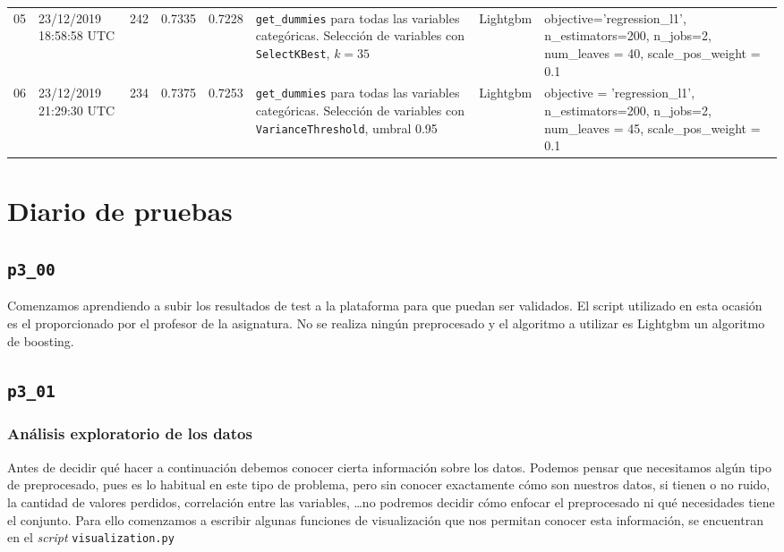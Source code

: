 \documentclass[a4paper, 20pt]{article}
\begin{document}
\begin{table}[H]
{\begin{tabular}{lL{2cm}lllL{3cm}L{2.5cm}L{3.5cm}}
05 & 23/12/2019 18:58:58 UTC & 242 & 0.7335 & 0.7228 & \texttt{get\_dummies} para todas las variables categóricas. Selección de variables con \texttt{SelectKBest}, $k =35$ & Lightgbm & {\ttfamily objective='regression\_l1', n\_estimators=200, n\_jobs=2, num\_leaves = 40, scale\_pos\_weight = 0.1}\\

06 & 23/12/2019 21:29:30 UTC & 234 & 0.7375 & 0.7253 & \texttt{get\_dummies} para todas las variables categóricas. Selección de variables con \texttt{VarianceThreshold}, umbral 0.95 & Lightgbm & {\ttfamily objective = 'regression\_l1', n\_estimators=200, n\_jobs=2, num\_leaves = 45, scale\_pos\_weight = 0.1}\\
\bottomrule
\end{tabular}}
\end{table}
\newpage

\section{Diario de pruebas}
\subsection{\texttt{p3\_00}}
Comenzamos aprendiendo a subir los resultados de test a la plataforma para que puedan ser validados. El script utilizado en esta ocasión es el proporcionado por el profesor de la asignatura. No se realiza ningún preprocesado y el algoritmo a utilizar es Lightgbm un algoritmo de boosting.

\subsection{\texttt{p3\_01}}
\subsubsection{Análisis exploratorio de los datos}

Antes de decidir qué hacer a continuación debemos conocer cierta información sobre los datos. Podemos pensar que necesitamos algún tipo de preprocesado, pues es lo habitual en este tipo de problema, pero sin conocer exactamente cómo son nuestros datos, si tienen o no ruido, la cantidad de valores perdidos, correlación entre las variables, \dots no podremos decidir cómo enfocar el preprocesado ni qué necesidades tiene el conjunto. Para ello comenzamos a escribir algunas funciones de visualización que nos permitan conocer esta información, se encuentran en el \textit{script} \texttt{visualization.py}
\end{document}
